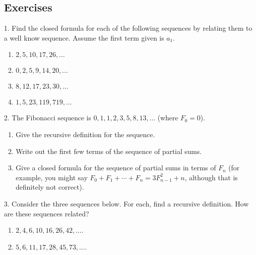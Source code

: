 \documentclass[10pt,]{book}
\theoremstyle{plain}
\theoremstyle{definition}
\theoremstyle{definition}
\theoremstyle{definition}
\numberwithin{equation}{chapter}
\begin{document}
\subsection[Exercises]{Exercises}\label{exercises-12}
\begin{exerciselist}
\item[1.]\hypertarget{exercise-138}{}
          Find the closed formula for each of the following sequences by relating them to a well know sequence. Assume the first term given is \(a_1\).
\leavevmode%
\begin{enumerate}[label=(\alph*)]
\item\hypertarget{li-852}{}\(2, 5, 10, 17, 26, \ldots\)%
\item\hypertarget{li-853}{}\(0, 2, 5, 9, 14, 20, \ldots\)%
\item\hypertarget{li-854}{}\(8, 12, 17, 23, 30,\ldots\)%
\item\hypertarget{li-855}{}\(1, 5, 23, 119, 719,\ldots\)%
\end{enumerate}
\par\smallskip
\item[2.]\hypertarget{exercise-139}{}
          The Fibonacci sequence is \(0, 1, 1, 2, 3, 5, 8, 13, \ldots\) (where \(F_0 = 0\)).
\leavevmode%
\begin{enumerate}[label=(\alph*)]
\item\hypertarget{li-860}{}
              Give the recursive definition for the sequence.
\item\hypertarget{li-861}{}
              Write out the first few terms of the sequence of partial sums.
\item\hypertarget{li-862}{}
              Give a closed formula for the sequence of partial sums in terms of \(F_n\)\label{notation-9}
 (for example, you might say \(F_0 + F_1 + \cdots + F_n = 3F_{n-1}^2 + n\), although that is definitely not correct).
\end{enumerate}
\par\smallskip
\item[3.]\hypertarget{exercise-140}{}
          Consider the three sequences below. For each, find a recursive definition. How are these sequences related?
\leavevmode%
\begin{enumerate}[label=(\alph*)]
\item\hypertarget{li-866}{}\(2, 4, 6, 10, 16, 26, 42, \ldots\).%
\item\hypertarget{li-867}{}\(5, 6, 11, 17, 28, 45, 73, \ldots\).%

\end{enumerate}
\end{exerciselist}
\end{document}
